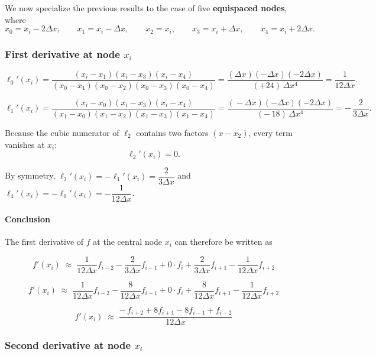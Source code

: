 We now specialize the previous results to the case of five \textbf{equispaced nodes}, where
\[
x_{0} = x_i - 2\Delta x,\qquad
x_{1} = x_i - \Delta x,\qquad
x_{2} =x_i,\qquad
x_{3} = x_i + \Delta x,\qquad
x_{4} = x_i + 2\Delta x.
\]

\subsubsection{First derivative at node \(x_i\)}

\[
\ell_0'(x_i)=
\frac{(x_i-x_1)(x_i-x_3)(x_i-x_4)}
     {(x_0-x_1)(x_0-x_2)(x_0-x_3)(x_0-x_4)}
=
\frac{(\Delta x)(-\Delta x)(-2\Delta x)}{(+24)\,\Delta x^{4}}
= \frac{1}{12\Delta x} .
\]

\[
\ell_1'(x_i)=
\frac{(x_i-x_0)(x_i-x_3)(x_i-x_4)}
     {(x_1-x_0)(x_1-x_2)(x_1-x_3)(x_1-x_4)}
=
\frac{( \!\!-\!\Delta x)(-\Delta x)(-2\Delta x)}{(-\,18)\,\Delta x^{4}}
=-\,\frac{2}{3\Delta x}.
\]

\clearpage

Because the cubic numerator of \(\ell_2\) contains two factors
\((x-x_2)\), every term vanishes at \(x_i\):
\[
\ell_2'(x_i)=0 .
\]


By symmetry, \qquad \(\ell_3'(x_i)=-\ell_1'(x_i)=\dfrac{2}{3\Delta x}\) \qquad  and \qquad \(\ell_4'(x_i)=-\ell_0'(x_i)=-\dfrac{1}{12\Delta x}\).

\paragraph{Conclusion}

The first derivative of \(f\) at the central node \(x_i\) can therefore be written as

\[
f'(x_i)\;\approx\;
\frac{1}{12\Delta x}f_{i-2}
-\frac{2}{3\Delta x}f_{i-1}
+0\cdot f_i
+\frac{2}{3\Delta x}f_{i+1}
-\frac{1}{12\Delta x}f_{i+2}
\]

\[
f'(x_i)\;\approx\;
\frac{1}{12\Delta x}f_{i-2}
-\frac{8}{12\Delta x}f_{i-1}
+0\cdot f_i
+\frac{8}{12\Delta x}f_{i+1}
-\frac{1}{12\Delta x}f_{i+2}
\]

\[
f'(x_i)\;\approx\;
\frac{-\,f_{i+2}+8f_{i+1}-8f_{i-1}+f_{i-2}}{12\Delta x}
\]

\subsubsection{Second derivative at node \(x_i\)}

